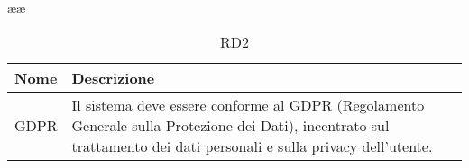 ææ\documentclass{natourDoc}
\begin{document}
	\begin{table}[H]
		\centering
		\begin{tabular}{ |p{5cm}|p{10.3cm}| }
			\hline
			\rowcolor{PineGreen!70}
			\textbf{Nome} & \textbf{Descrizione} \\
			\hline
			GDPR & Il sistema deve essere conforme al GDPR (Regolamento Generale sulla Protezione dei Dati), 
			incentrato sul trattamento dei dati personali e sulla privacy dell’utente.  \\
			\hline
		\end{tabular}
		\caption{RD2}
		\label{table:27}
	\end{table}
\end{document}
